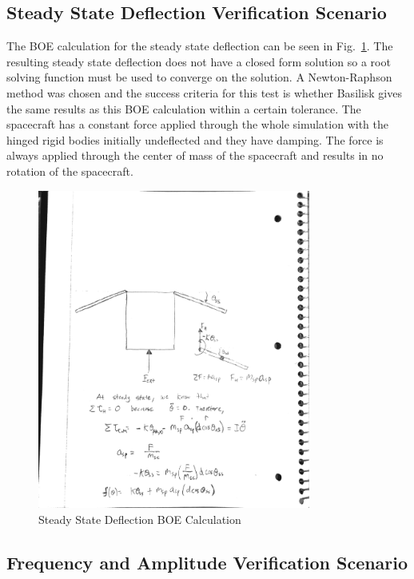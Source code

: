 \subsection{Steady State Deflection Verification Scenario}

The BOE calculation for the steady state deflection can be seen in Fig.~\ref{fig:BOEThetaSS}. The resulting steady state deflection does not have a closed form solution so a root solving function must be used to converge on the solution. A Newton-Raphson method was chosen and the success criteria for this test is whether Basilisk gives the same results as this BOE calculation within a certain tolerance. The spacecraft has a constant force applied through the whole simulation with the hinged rigid bodies initially undeflected and they have damping. The force is always applied through the center of mass of the spacecraft and results in no rotation of the spacecraft. 

\begin{figure}[htbp]
	\centerline{
		\includegraphics[width=0.8\textwidth]{Figures/BOEThetaSS}}
	\caption{Steady State Deflection BOE Calculation}
	\label{fig:BOEThetaSS}
\end{figure}

\subsection{Frequency and Amplitude Verification Scenario}

